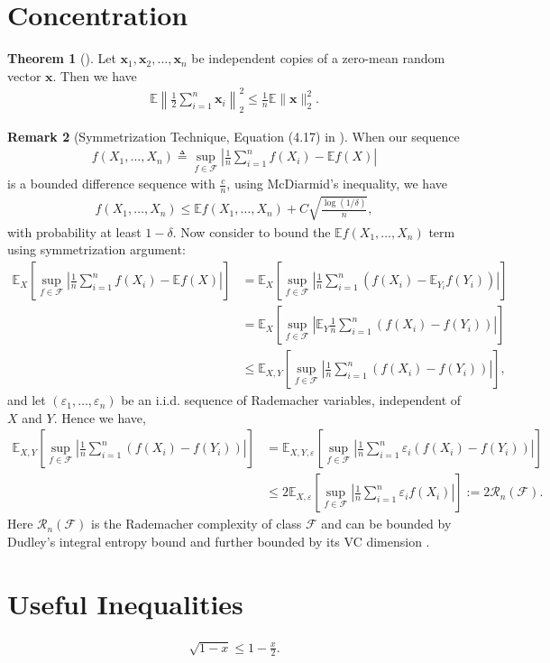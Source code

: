 \documentclass[twoside,11pt]{article}
\newcommand{\E}{\mathbb{E}}
\newcommand{\x}{\boldsymbol{x}}
\newcommand{\0}{\boldsymbol{0}}
\theoremstyle{definition}
\newtheorem{theorem}{Theorem}[section]
\newtheorem{remark}[theorem]{Remark}
\begin{document}
\section{Concentration}

\begin{theorem}[\cite{juditsky2008large}] Let $\x_1, \x_2, \ldots, \x_n$ be independent copies of a zero-mean random vector $\x$. Then we have
\begin{align}
\label{eq:iid-concen}
\E \left \| \frac{1}{2} \sum_{i=1}^n \x_i \right\|_2^2 \leq \frac{1}{n} \E \| \x \|_2^2.
\end{align}
\end{theorem}

\begin{remark}[Symmetrization Technique, Equation (4.17) in \cite{wainwright2019high}] When our sequence
\begin{align*}
f(X_1, \ldots, X_n) \triangleq \sup_{f \in \mathcal{F}} \left| \frac{1}{n} \sum_{i=1}^n f(X_i) - \E f(X)\right|
\end{align*}
is a bounded difference sequence with $\frac{c}{n}$, using McDiarmid's inequality, we have
\begin{align*}
 f(X_1, \ldots, X_n) \leq \E f(X_1, \ldots, X_n) + C \sqrt{\frac{\log (1 / \delta)}{n}},
\end{align*}
with probability at least $1 - \delta$. Now consider to bound the $\E f(X_1, \ldots, X_n)$ term using symmetrization argument:
\begin{align*}
\E_X \left[\sup_{f \in \mathcal{F}} \left| \frac{1}{n} \sum_{i=1}^n f(X_i) - \E f(X)\right|\right] &= \E_X \left[\sup_{f \in \mathcal{F}} \left| \frac{1}{n} \sum_{i=1}^n \left(f(X_i) - \E_{Y_i} f(Y_i) \right)\right|\right] \\
&= \E_X \left[\sup_{f \in \mathcal{F}} \left| \E_Y \frac{1}{n} \sum_{i=1}^n \left(f(X_i) - f(Y_i) \right)\right|\right] \\
&\leq \E_{X,Y} \left[\sup_{f \in \mathcal{F}} \left| \frac{1}{n} \sum_{i=1}^n \left(f(X_i) - f(Y_i) \right)\right|\right],
\end{align*}
and let $(\varepsilon_1, \ldots, \varepsilon_n)$ be an i.i.d. sequence of Rademacher variables, independent of $X$ and $Y$. Hence we have,
\begin{align*}
\E_{X,Y} \left[\sup_{f \in \mathcal{F}} \left| \frac{1}{n} \sum_{i=1}^n \left(f(X_i) - f(Y_i) \right)\right|\right]
&= \E_{X,Y, \varepsilon} \left[\sup_{f \in \mathcal{F}} \left| \frac{1}{n} \sum_{i=1}^n \varepsilon_i \left(f(X_i) - f(Y_i) \right)\right|\right] \\
&\leq 2 \E_{X, \varepsilon} \left[\sup_{f \in \mathcal{F}} \left| \frac{1}{n} \sum_{i=1}^n \varepsilon_i f(X_i)\right|\right] := 2 \mathcal{R}_n(\mathcal{F}).
\end{align*}
Here $\mathcal{R}_n(\mathcal{F})$ is the Rademacher complexity of class $\mathcal{F}$ and can be bounded by Dudley's integral entropy \citep[Theorem 5.22]{wainwright2019high} bound and further bounded by its VC dimension \citep[Equation (5.48)]{wainwright2019high}.
\end{remark}

\section{Useful Inequalities}
\begin{align}
\label{eq:ineq-1}
\sqrt{1 - x} \leq 1 - \frac{x}{2}.
\end{align}

\newpage

\end{document}
